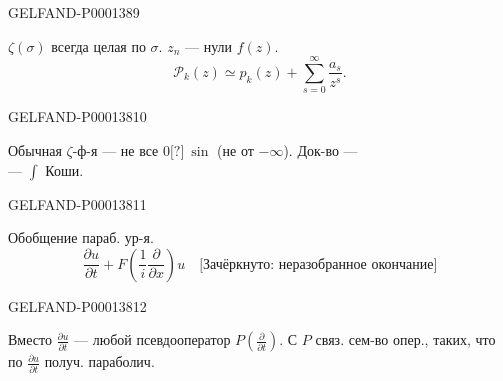 \begin{GelfandAdjacentEvidence}{GELFAND-P000138}{9}

$\zeta(\sigma)$ всегда целая по $\sigma$. $z_n$ — нули $f(z)$.
\begin{equation*}\mathcal P_k(z)\simeq p_k(z)+\sum_{s=0}^{\infty}\frac{a_s}{z^s}.\end{equation*}
\end{GelfandAdjacentEvidence}
\begin{GelfandAdjacentEvidence}{GELFAND-P000138}{10}

Обычная $\zeta$-ф-я — не все $0\text{[?]}\ \sin$ (не от $-\infty$). Док-во —\\
— $\int$ Коши.
\end{GelfandAdjacentEvidence}
\begin{GelfandAdjacentEvidence}{GELFAND-P000138}{11}


 Обобщение параб. ур-я.
\begin{equation*}\frac{\partial u}{\partial t}+F\left(\frac1i\frac{\partial}{\partial x}\right)u\quad\text{[Зачёркнуто: неразобранное окончание]}\end{equation*}
\end{GelfandAdjacentEvidence}
\begin{GelfandAdjacentEvidence}{GELFAND-P000138}{12}

Вместо $\frac{\partial u}{\partial t}$ — любой псевдооператор $P\left(\frac{\partial}{\partial t}\right)$. С $P$ связ. сем-во опер., таких, что по $\frac{\partial u}{\partial t}$ получ. параболич.
\end{GelfandAdjacentEvidence}



